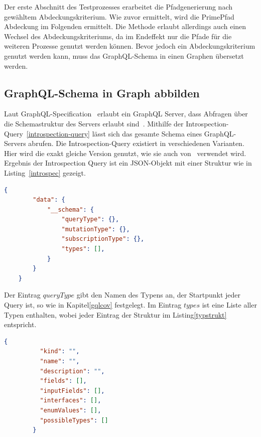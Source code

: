 Der erste Abschnitt des Testprozesses erarbeitet die Pfadgenerierung nach gewähltem Abdeckungskriterium.
Wie zuvor ermittelt, wird die PrimePfad Abdeckung im Folgenden ermittelt.
Die Methode erlaubt allerdings auch einen Wechsel des Abdeckungskriteriums, da im Endeffekt nur die Pfade für die weiteren Prozesse
genutzt werden können.
Bevor jedoch ein Abdeckungskriterium genutzt werden kann, muss das GraphQL-Schema in einen Graphen übersetzt werden.

\subsection{GraphQL-Schema in Graph abbilden}
\label{schemagraph}

Laut GraphQL-Specification~\cite{graphqlspecification} erlaubt ein GraphQL Server, dass Abfragen über die Schemastruktur des
Servers erlaubt sind~\cite[vgl. 4. Introspection]{graphqlspecification}.
Mithilfe der Introspection-Query~\ref{introspection-query} lässt sich das gesamte Schema eines GraphQL-Servers abrufen.
Die Introspection-Query existiert in verschiedenen Varianten.
Hier wird die exakt gleiche Version genutzt, wie sie auch von~\cite{property-based-testing} verwendet wird.
Ergebnis der Introspection Query ist ein JSON-Objekt mit einer Struktur wie in Listing~\ref{introspec} gezeigt.

\begin{lstlisting}[language=json, caption={Schema-Response},captionpos=b]
    {
        "data": {
            "__schema": {
                "queryType": {},
                "mutationType": {},
                "subscriptionType": {},
                "types": [],
            }
        }
    }
\end{lstlisting}
\label{introspec}

Der Eintrag $queryType$ gibt den Namen des Typens an, der Startpunkt jeder Query ist, so wie in Kapitel\ref{gqlcov} festgelegt.
Im Eintrag $types$ ist eine Liste aller Typen enthalten, wobei jeder Eintrag der Struktur im Listing\ref{typstrukt} entspricht.

\begin{lstlisting}[language=json, caption={Type-Field},captionpos=b]
        {
          "kind": "",
          "name": "",
          "description": "",
          "fields": [],
          "inputFields": [],
          "interfaces": [],
          "enumValues": [],
          "possibleTypes": []
        }
\end{lstlisting}
\label{typstrukt}


